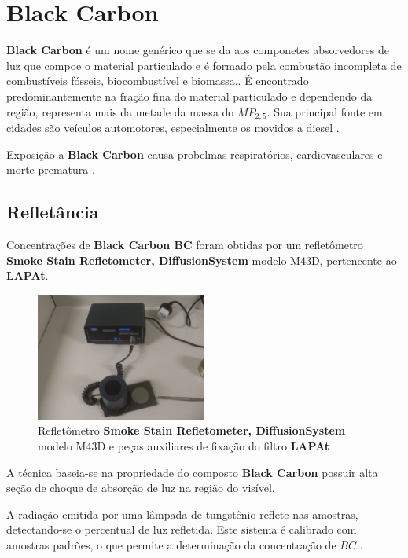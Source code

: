 \section{Black Carbon}

\textbf{Black Carbon} é um nome genérico que se da aos componetes
absorvedores de luz que compoe o material particulado e é formado pela combustão
incompleta de combustíveis fósseis, biocombustível e biomassa.. 
É encontrado predominantemente na fração fina do material particulado 
e dependendo da região, representa mais da metade da massa do $MP_{2,5}$. 
Sua principal fonte em cidades são veículos automotores, 
especialmente os movidos a diesel \citep{petzold2013}. 

Exposição a \textbf{Black Carbon} causa probelmas respiratórios, cardiovasculares 
e morte prematura \citep{jacobson2014}.

\subsection{Refletância}

Concentrações de \textbf{Black Carbon BC} foram obtidas por um 
refletômetro \textbf{Smoke Stain Refletometer, DiffusionSystem} modelo M43D, 
pertencente ao \textbf{LAPAt}.

\begin{figure}[H]
  \centering
  \includegraphics[width=0.5\textwidth]{../inputs/images/refletometro.jpg}
  \caption{Refletômetro \textbf{Smoke Stain Refletometer, DiffusionSystem} modelo M43D 
           e peças auxiliares de fixação do filtro \textbf{LAPAt}}
\end{figure}

A técnica baseia-se na propriedade do composto \textbf{Black Carbon} 
possuir alta seção de choque de absorção de luz na região do visível.

A radiação emitida por uma lâmpada de tungstênio reflete nas amostras, 
detectando-se o percentual de luz refletida. Este sistema é calibrado 
com amostras padrões, o que permite a determinação da concentração de $BC$
\citep{lack2014}.

